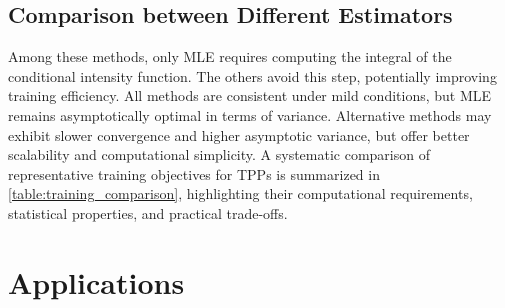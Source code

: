 \documentclass[10pt]{article} %
\begin{document}
\subsection{Comparison between Different Estimators}
Among these methods, only MLE requires computing the integral of the conditional intensity function. The others avoid this step, potentially improving training efficiency. All methods are consistent under mild conditions, but MLE remains asymptotically optimal in terms of variance. Alternative methods may exhibit slower convergence and higher asymptotic variance, but offer better scalability and computational simplicity.
A systematic comparison of representative training objectives for TPPs is summarized in \cref{table:training_comparison}, highlighting their computational requirements, statistical properties, and practical trade-offs. 


\begin{table}[!htbp]
\caption{Comparison of TPP training objectives.} 
\label{table:training_comparison}
\centering
{}
\end{table}




\section{Applications}

\end{document}
